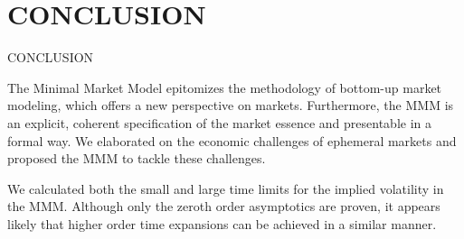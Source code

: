 \documentclass[unknownkeysallowed, compress]{beamer}
\theoremstyle{plain}
\begin{document}
\section{CONCLUSION}
\begin{frame}[allowframebreaks]{CONCLUSION}
\noindent


\par The Minimal Market Model epitomizes the methodology of bottom-up
market modeling, which offers a new perspective on markets. Furthermore,
the MMM is an explicit, coherent specification of the market essence and
presentable in a formal way. We elaborated on the economic challenges of
ephemeral markets and proposed the MMM to tackle these challenges.\\

\par We calculated both the small and large time limits for the implied volatility in the MMM. Although only the zeroth order asymptotics are proven, it appears likely that higher order time expansions can be achieved in a similar manner.









\end{frame}
\end{document}
